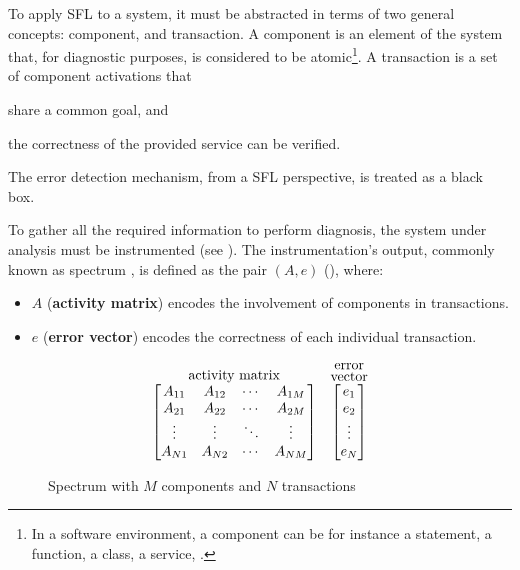 To apply \ac{SFL} to a system, it must be abstracted in terms of two
general concepts: component, and transaction.
%
A component is an element of the system that, for diagnostic purposes,
is considered to be atomic\footnote{In a software environment, a
  component can be for instance a statement, a function, a class, a
  service, \etc.}.
%
A transaction is a set of component activations that
\begin{inparaenum}[(1)]
\item share a common goal, and
\item the correctness of the provided service can be verified.
\end{inparaenum}
%
The error detection mechanism, from a \ac{SFL} perspective, is treated
as a black box.

To gather all the required information to perform diagnosis, the
system under analysis must be instrumented (see
).
%
The instrumentation's output, commonly known as
spectrum \citep{Harrold98}, is defined as the
pair $(A, e)$ (), where:

\begin{itemize}
\item $A$ (\textbf{activity matrix}) encodes the involvement of
  components in transactions.
\item $e$ (\textbf{error vector}) encodes the correctness of each
  individual transaction.
\end{itemize}

\begin{figure}[!ht]
  \begin{equation*}
    \stackrel{\mbox{activity matrix}}{%
      \begin{bmatrix}
        A_{11} & A_{12} & \cdots & A_{1M} \\
        A_{21} & A_{22} & \cdots & A_{2M} \\
        \vdots & \vdots & \ddots & \vdots \\
        A_{N1} & A_{N2} & \cdots & A_{NM}
      \end{bmatrix}
    }\ \ \ \stackrel{\stackrel{\mbox{error}}{\mbox{vector}}}{%
      \begin{bmatrix}
        e_1    \\
        e_2    \\
        \vdots \\
        e_N
      \end{bmatrix}%
    }
  \end{equation*}
  \caption{Spectrum with $M$ components and $N$ transactions\label{fig:intro:sfl-matrix}}
\end{figure}

